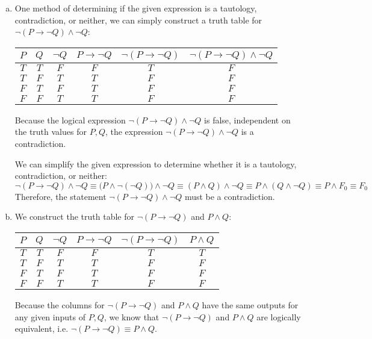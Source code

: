 \documentclass[11pt,letterpaper]{article}
\begin{document}
\sol 
\begin{enumerate}[(a)]
\item One method of determining if the given expression is a tautology, contradiction, or neither, we can simply construct a truth table for $\neg (P \to \neg Q) \wedge \neg Q$: \par
	\begin{table}[H]
	\centering
	\begin{tabular}{cc|ccc|c}
	$P$ & $Q$ & $\neg Q$ & $P \to \neg Q$ & $\neg (P \to \neg Q)$ & $\neg (P \to \neg Q) \wedge \neg Q$ \\ \hline
	$T$ & $T$ & $F$ & $F$ & $T$ & $F$ \\
	$T$ & $F$ & $T$ & $T$ & $F$ & $F$ \\
	$F$ & $T$ & $F$ & $T$ & $F$ & $F$ \\
	$F$ & $F$ & $T$ & $T$ & $F$ & $F$
	\end{tabular}
	\end{table} \par
Because the logical expression $\neg (P \to \neg Q) \wedge \neg Q$ is false, independent on the truth values for $P, Q$, the expression $\neg (P \to \neg Q) \wedge \neg Q$ is a contradiction. \pspace

We can simplify the given expression to determine whether it is a tautology, contradiction, or neither:
	\[
	\neg (P \to \neg Q) \wedge \neg Q \equiv \big(P \wedge \neg (\neg Q) \big) \wedge \neg Q \equiv (P \wedge Q) \wedge \neg Q \equiv P \wedge (Q \wedge \neg Q) \equiv P \wedge F_0 \equiv F_0
	\]
Therefore, the statement $\neg (P \to \neg Q) \wedge \neg Q$ must be a contradiction. \pspace

\item We construct the truth table for $\neg (P \to \neg Q)$ and $P \wedge Q$: \par
	\begin{table}[H]
	\centering
	\begin{tabular}{cc|ccc|c}
	$P$ & $Q$ & $\neg Q$ & $P \to \neg Q$ & $\neg (P \to \neg Q)$ & $P \wedge Q$ \\ \hline
	$T$ & $T$ & $F$ & $F$ & $T$ & $T$ \\
	$T$ & $F$ & $T$ & $T$ & $F$ & $F$ \\
	$F$ & $T$ & $F$ & $T$ & $F$ & $F$ \\
	$F$ & $F$ & $T$ & $T$ & $F$ & $F$
	\end{tabular}
	\end{table} \par
Because the columns for $\neg (P \to \neg Q)$ and $P \wedge Q$ have the same outputs for any given inputs of $P, Q$, we know that $\neg (P \to \neg Q)$ and $P \wedge Q$ are logically equivalent, i.e. $\neg (P \to \neg Q) \equiv P \wedge Q$. \pspace



\end{enumerate}
\end{document}
